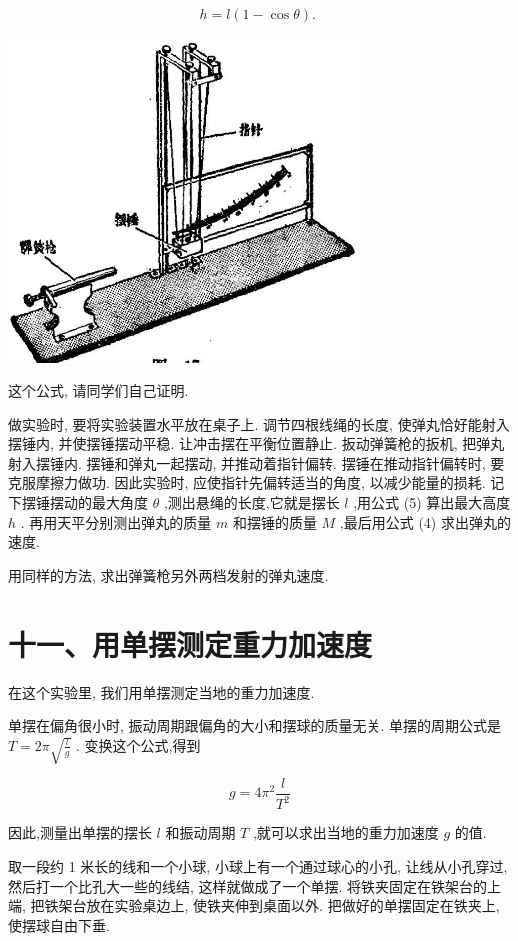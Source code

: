 \documentclass[10pt]{article}
\begin{document}
\[
h = l\left( {1 - \cos \theta }\right) \text{. } \tag{5}
\]

\begin{center}
\includegraphics[max width=0.7\textwidth]{images/01912d55-147c-70aa-b0e0-1782a122f948_336_709678.jpg}
\end{center}

这个公式, 请同学们自己证明.

做实验时, 要将实验装置水平放在桌子上. 调节四根线绳的长度, 使弹丸恰好能射入摆锤内, 并使摆锤摆动平稳. 让冲击摆在平衡位置静止. 扳动弹簧枪的扳机, 把弹丸射入摆锤内. 摆锤和弹丸一起摆动, 并推动着指针偏转. 摆锤在推动指针偏转时, 要克服摩擦力做功. 因此实验时, 应使指针先偏转适当的角度, 以减少能量的损耗. 记下摆锤摆动的最大角度 \(\theta\) ,测出悬绳的长度,它就是摆长 \(l\) ,用公式 (5) 算出最大高度 \(h\) . 再用天平分别测出弹丸的质量 \(m\) 和摆锤的质量 \(M\) ,最后用公式 (4) 求出弹丸的速度.

用同样的方法, 求出弹簧枪另外两档发射的弹丸速度.

\section*{十一、用单摆测定重力加速度}

在这个实验里, 我们用单摆测定当地的重力加速度.

单摆在偏角很小时, 振动周期跟偏角的大小和摆球的质量无关. 单摆的周期公式是 \(T = {2\pi }\sqrt{\frac{l}{g}}\) . 变换这个公式,得到

\[
g = 4{\pi }^{2}\frac{l}{{T}^{2}}
\]

因此,测量出单摆的摆长 \(l\) 和振动周期 \(T\) ,就可以求出当地的重力加速度 \(g\) 的值.

取一段约 1 米长的线和一个小球, 小球上有一个通过球心的小孔, 让线从小孔穿过, 然后打一个比孔大一些的线结, 这样就做成了一个单摆. 将铁夹固定在铁架台的上端, 把铁架台放在实验桌边上, 使铁夹伸到桌面以外. 把做好的单摆固定在铁夹上, 使摆球自由下垂.
\end{document}

